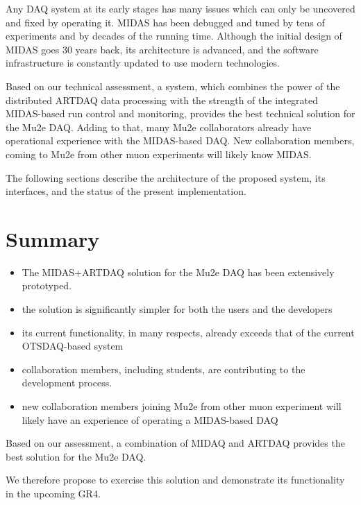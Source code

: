 \documentclass[12pt]{article}
\begin{document}
Any DAQ system at its early stages has many issues which can only be uncovered and fixed
by operating it. MIDAS has been debugged and tuned by tens of experiments
and by decades of the running time. Although the initial design of MIDAS goes 30 years back,
its architecture is advanced, and the software infrastructure is constantly updated
to use modern technologies.

Based on our technical assessment, a system, which combines the power of
the distributed ARTDAQ data processing with the strength of the integrated
MIDAS-based run control and monitoring, provides the best technical solution
for the Mu2e DAQ.
%
Adding to that, many Mu2e collaborators already have operational experience with
the MIDAS-based DAQ. New collaboration members, coming to Mu2e from other muon 
experiments will likely know MIDAS.

The following sections describe the architecture of the proposed system,
its interfaces, and the status of the present implementation.




% 




\section {Summary}

\begin{itemize}
\item 
  The MIDAS+ARTDAQ solution for the Mu2e DAQ has been extensively prototyped.
\item
  the solution is significantly simpler for both the users and the developers
\item
  its current functionality, in many respects, already exceeds that
  of the current OTSDAQ-based system  
\item
  collaboration members, including students, are contributing
  to the development process. 
\item
  new collaboration members joining Mu2e from other muon experiment will
  likely have an experience of operating a MIDAS-based DAQ
\end{itemize}

Based on our assessment, a combination of MIDAQ and  ARTDAQ
provides the best solution for the Mu2e DAQ.

We therefore propose to exercise this solution and demonstrate
its functionality in the upcoming GR4.

%
\newpage



% 

\end{document}
